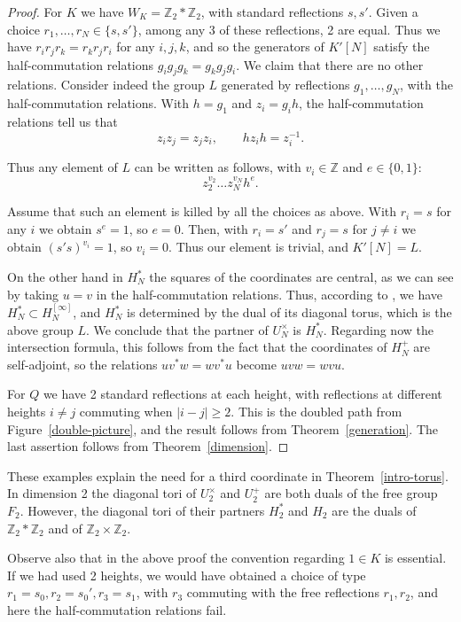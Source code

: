 \documentclass[11pt,a4paper]{article}
\begin{document}
\begin{proof}
For $K$ we have $W_K=\mathbb Z_2*\mathbb Z_2$, with standard reflections $s,s'$. Given a choice $r_1,\ldots,r_N\in\{s,s'\}$, among any 3 of these reflections, 2 are equal. Thus we have $r_ir_jr_k=r_kr_jr_i$ for any $i,j,k$, and so the generators of $K'[N]$ satisfy the half-commutation relations $g_ig_jg_k=g_kg_jg_i$. We claim that there are no other relations. Consider indeed the group $L$ generated by reflections $g_1,\ldots,g_N$, with the half-commutation relations. With $h=g_1$ and $z_i=g_ih$, the half-commutation relations tell us that
\[
 z_iz_j=z_jz_i,\qquad hz_ih=z_i^{-1}.
\]

Thus any element of $L$ can be written as follows, with $v_i\in\mathbb Z$ and $e\in\{0,1\}$:
\[
 z_2^{v_2}\ldots z_N^{v_N}h^e.
\]

Assume that such an element is killed by all the choices as above. With $r_i=s$ for any $i$ we obtain $s^e=1$, so $e=0$. Then, with $r_i=s'$ and $r_j=s$ for $j\neq i$ we obtain $(s's)^{v_i}=1$, so $v_i=0$. Thus our element is trivial, and $K'[N]=L$.

On the other hand in $H_N^*$ the squares of the coordinates are central, as we can see by taking $u=v$ in the half-commutation relations. Thus, according to \cite{rw}, we have $H_N^*\subset H_N^{[\infty]}$, and $H_N^*$ is determined by the dual of its diagonal torus, which is the above group $L$. We conclude that the partner of $U_N^\times$ is $H_N^*$. Regarding now the intersection formula, this follows from the fact that the coordinates of $H_N^+$ are self-adjoint, so the relations $uv^*w=wv^*u$ become $uvw=wvu$.

For $Q$ we have 2 standard reflections at each height, with reflections at different heights $i\neq j$ commuting when $|i-j|\geq2$. This is the doubled path from Figure~\ref{double-picture}, and the result follows from Theorem~\ref{generation}. The last assertion follows from Theorem~\ref{dimension}.
\end{proof}

These examples explain the need for a third coordinate in Theorem~\ref{intro-torus}. In dimension 2 the diagonal tori of $U_2^\times$ and $U_2^+$ are both duals of the free group $F_2$. However, the diagonal tori of their partners $H_2^*$ and $H_2$ are the duals of $\mathbb Z_2*\mathbb Z_2$ and of $\mathbb Z_2\times\mathbb Z_2$.

Observe also that in the above proof the convention regarding $1\in K$ is essential. If we had used 2 heights, we would have obtained a choice of type $r_1=s_0,r_2=s_0',r_3=s_1$, with $r_3$ commuting with the free reflections $r_1,r_2$, and here the half-commutation relations fail.
\end{document}
